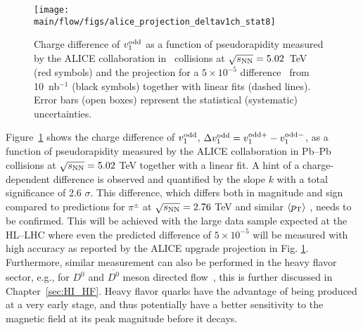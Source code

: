 \begin{figure}[!htb]
\begin{center}
\texttt{[image: \\main/flow/figs/alice\_projection\_deltav1ch\_stat8]}
\caption{
Charge difference of $v_1^{\rm odd}$ as a function of pseudorapidity measured 
  by the ALICE collaboration in \pbpb\ collisions at $\sqrt{s_{\mathrm{NN}}}=5.02$~TeV~\cite{Margutti:2017lup} 
  (red symbols) and the projection for a $5 \times 10^{-5}$ difference~\cite{Gursoy:2014aka} 
  from 10~nb$^{-1}$ (black symbols) together with linear fits (dashed lines). 
Error bars (open boxes) represent the statistical (systematic) uncertainties.}
\label{fig:alice_delta_v1}
\end{center}
\end{figure}


Figure~\ref{fig:alice_delta_v1} shows the charge difference of $v_1^{\rm odd}$, 
$\Delta v_1^{\rm odd}=v_1^{\rm odd +} - v_1^{\rm odd -}$, as a function of pseudorapidity measured by the ALICE collaboration in Pb--Pb collisions 
at $\sqrt{s_{\mathrm{NN}}}=5.02$ TeV \cite{Margutti:2017lup} together with a linear fit. A hint of a charge-dependent difference is observed and quantified 
by the slope $k$ with a total significance of 2.6 $\sigma$. This difference, which differs both in magnitude and sign compared to predictions for 
$\pi^{\pm}$ at $\sqrt{s_{\mathrm{NN}}}=2.76$ TeV and similar $\langle p_{\rm T} \rangle$ \cite{Gursoy:2014aka}, needs to be confirmed. 
This will be achieved 
with the large data sample expected at the HL--LHC where even the predicted difference of $5 \times 10^{-5}$ will be measured with high accuracy 
as reported by the ALICE upgrade projection in Fig. \ref{fig:alice_delta_v1}. Furthermore, similar measurement can also be performed
in the heavy flavor sector, e.g., for $D^{0}$ and $\overline{D^{0}}$ meson directed flow~\cite{Das:2016cwd}, this is further discussed in Chapter~\ref{sec:HI_HF}. 
Heavy flavor quarks have the advantage of being produced at a very early stage, and thus potentially have a better sensitivity to the magnetic field at its peak magnitude before it decays.




